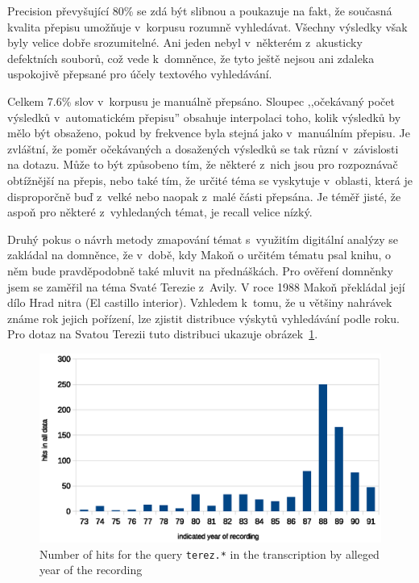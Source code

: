 Precision převyšující 80\% se zdá být slibnou a poukazuje na fakt, že současná
kvalita přepisu umožňuje v~korpusu rozumně vyhledávat. Všechny výsledky však
byly velice dobře srozumitelné. Ani jeden nebyl v~některém z~akusticky
defektních souborů, což vede k~domněnce, že tyto ještě nejsou ani zdaleka
uspokojivě přepsané pro účely textového vyhledávání.

Celkem 7.6\% slov v~korpusu je manuálně přepsáno. Sloupec ,,očekávaný počet
výsledků v~automatickém přepisu'' obsahuje interpolaci toho, kolik výsledků by
mělo být obsaženo, pokud by frekvence byla stejná jako v~manuálním přepisu. Je
zvláštní, že poměr očekávaných a dosažených výsledků se tak různí v~závislosti
na dotazu. Může to být způsobeno tím, že některé z~nich jsou pro rozpoznávač
obtížnější na přepis, nebo také tím, že určité téma se vyskytuje v~oblasti,
která je disproporčně buď z~velké nebo naopak z~malé části přepsána. Je téměř
jisté, že aspoň pro některé z~vyhledaných témat, je recall velice nízký.

Druhý pokus o návrh metody zmapování témat s~využitím digitální analýzy se zakládal na
domněnce, že v~době, kdy Makoň o určitém tématu psal knihu, o něm bude
pravděpodobně také mluvit na přednáškách. Pro ověření domněnky jsem se zaměřil
na téma Svaté Terezie z~Avily. V roce 1988 Makoň překládal její dílo Hrad nitra
(El castillo interior). Vzhledem k~tomu, že u většiny nahrávek známe rok jejich
pořízení, lze zjistit distribuce výskytů vyhledávání podle roku. Pro dotaz na
Svatou Terezii tuto distribuci ukazuje obrázek~\ref{fig:teresa-year}.

\begin{figure}[htpb]
\includegraphics[scale=0.6]{rc/teresa-by-year.eps}
\caption{Number of hits for the query \texttt{terez.*} in the transcription by
alleged year of the recording}
\label{fig:teresa-year}
\end{figure}

